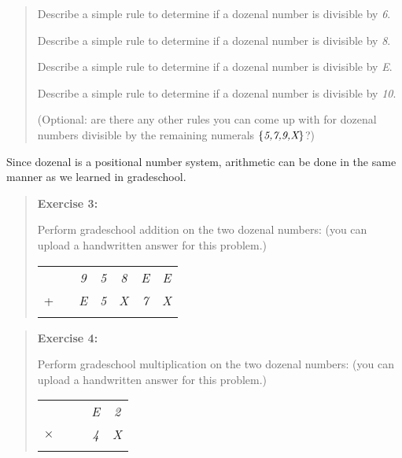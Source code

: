 \documentclass[10pt,letterpaper,unboxed,cm]{article}
\begin{document}
\begin{enumerate}
\begin{quote}
		      Describe a simple rule to determine if a dozenal number is divisible by \emph{6}.

		      Describe a simple rule to determine if a dozenal number is divisible by \emph{8}.

		      Describe a simple rule to determine if a dozenal number is divisible by \emph{E}.

		      Describe a simple rule to determine if a dozenal number is divisible by \emph{10}.

		      (Optional: are there any other rules you can come up with for dozenal numbers divisible by the remaining numerals $\{\emph{5,7,9,X}\}$?)
	      \end{quote}

	      Since dozenal is a positional number system, arithmetic can be done in the same manner as we learned in gradeschool.

	      \begin{quote}
		      {\bf Exercise 3:}

		      Perform gradeschool addition on the two dozenal numbers: (you can upload a handwritten answer for this problem.)

		      \begin{tabular}{ccccccc}
			        &  & \emph{9} & \emph{5} & \emph{8} & \emph{E} & \emph{E} \\
			      + &  & \emph{E} & \emph{5} & \emph{X} & \emph{7} & \emph{X} \\
			      \hline
			        &  &          &          &          &          &          \\
		      \end{tabular}
	      \end{quote}

	      \begin{quote}
		      {\bf Exercise 4:}

		      Perform gradeschool multiplication on the two dozenal numbers: (you can upload a handwritten answer for this problem.)

		      \begin{tabular}{ccccc}
			               &  &  & \emph{E} & \emph{2} \\
			      $\times$ &  &  & \emph{4} & \emph{X} \\
			      \hline
			               &  &  &          &          \\
		      \end{tabular}
	      \end{quote}


\end{enumerate}
\end{document}
